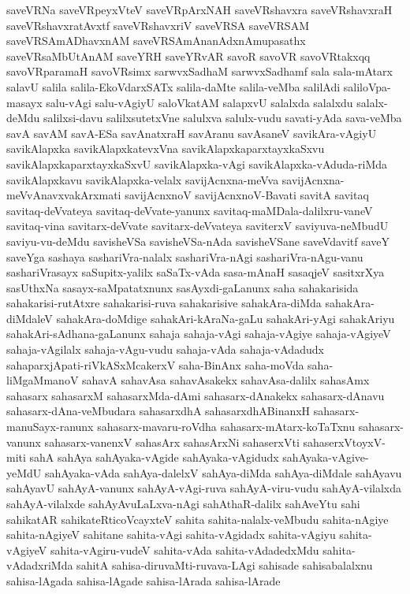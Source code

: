 {saveVRNa
saveVRpeyxVteV
saveVRpArxNAH
saveVRshavxra
saveVRshavxraH
saveVRshavxratAvxtf
saveVRshavxriV
saveVRSA
saveVRSAM
saveVRSAmADhavxnAM
saveVRSAmAnanAdxnAmupasathx
saveVRsaMbUtAnAM
saveYRH
saveYRvAR
savoR
savoVR
savoVRtakxqq
savoVRparamaH
savoVRsimx
sarwvxSadhaM
sarwvxSadhamf
sala
sala-mAtarx
salavU
salila
salila-EkoVdarxSATx
salila-daMte
salila-veMba
salilAdi
saliloVpa-masayx
salu-vAgi
salu-vAgiyU
saloVkatAM
salapxvU
salalxda
salalxdu
salalx-deMdu
salilxsi-davu
salilxsutetxVne
salulxva
salulx-vudu
savati-yAda
sava-veMba
savA
savAM
savA-ESa
savAnatxraH
savAranu
savAsaneV
savikAra-vAgiyU
savikAlapxka
savikAlapxkatevxVna
savikAlapxkaparxtayxkaSxvu
savikAlapxkaparxtayxkaSxvU
savikAlapxka-vAgi
savikAlapxka-vAduda-riMda
savikAlapxkavu
savikAlapxka-velalx
savijAcnxna-meVva
savijAcnxna-meVvAnavxvakArxmati
savijAcnxnoV
savijAcnxnoV-Bavati
savitA
savitaq
savitaq-deVvateya
savitaq-deVvate-yanunx
savitaq-maMDala-dalilxru-vaneV
savitaq-vina
savitarx-deVvate
savitarx-deVvateya
saviterxV
saviyuva-neMbudU
saviyu-vu-deMdu
savisheVSa
savisheVSa-nAda
savisheVSane
saveVdavitf
saveY
saveYga
sashaya
sashariVra-nalalx
sashariVra-nAgi
sashariVra-nAgu-vanu
sashariVrasayx
saSupitx-yalilx
saSaTx-vAda
sasa-mAnaH
sasaqjeV
sasitxrXya
sasUthxNa
sasayx-saMpatatxnunx
sasAyxdi-gaLanunx
saha
sahakarisida
sahakarisi-rutAtxre
sahakarisi-ruva
sahakarisive
sahakAra-diMda
sahakAra-diMdaleV
sahakAra-doMdige
sahakAri-kAraNa-gaLu
sahakAri-yAgi
sahakAriyu
sahakAri-sAdhana-gaLanunx
sahaja
sahaja-vAgi
sahaja-vAgiye
sahaja-vAgiyeV
sahaja-vAgilalx
sahaja-vAgu-vudu
sahaja-vAda
sahaja-vAdadudx
sahaparxjApati-riVkASxMcakerxV
saha-BinAnx
saha-moVda
saha-liMgaMmanoV
sahavA
sahavAsa
sahavAsakekx
sahavAsa-dalilx
sahasAmx
sahasarx
sahasarxM
sahasarxMda-dAmi
sahasarx-dAnakekx
sahasarx-dAnavu
sahasarx-dAna-veMbudara
sahasarxdhA
sahasarxdhABinanxH
sahasarx-manuSayx-ranunx
sahasarx-mavaru-roVdha
sahasarx-mAtarx-koTaTxnu
sahasarx-vanunx
sahasarx-vanenxV
sahasArx
sahasArxNi
sahaserxVti
sahaserxVtoyxV-miti
sahA
sahAya
sahAyaka-vAgide
sahAyaka-vAgidudx
sahAyaka-vAgive-yeMdU
sahAyaka-vAda
sahAya-dalelxV
sahAya-diMda
sahAya-diMdale
sahAyavu
sahAyavU
sahAyA-vanunx
sahAyA-vAgi-ruva
sahAyA-viru-vudu
sahAyA-vilalxda
sahAyA-vilalxde
sahAyAvuLaLxva-nAgi
sahAthaR-dalilx
sahAveYtu
sahi
sahikatAR
sahikateRticoVcayxteV
sahita
sahita-nalalx-veMbudu
sahita-nAgiye
sahita-nAgiyeV
sahitane
sahita-vAgi
sahita-vAgidadx
sahita-vAgiyu
sahita-vAgiyeV
sahita-vAgiru-vudeV
sahita-vAda
sahita-vAdadedxMdu
sahita-vAdadxriMda
sahitA
sahisa-diruvaMti-ruvava-LAgi
sahisade
sahisabalalxnu
sahisa-lAgada
sahisa-lAgade
sahisa-lArada
sahisa-lArade
}
